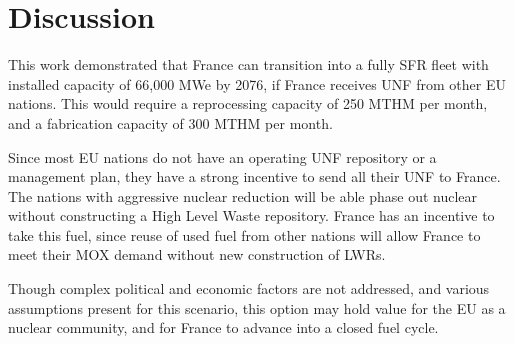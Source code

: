 \section{Discussion}
This work demonstrated that France can transition into
a fully \gls{SFR} fleet with installed capacity of 66,000 MWe by 2076,
if France receives \gls{UNF} from other \gls{EU} nations.
This would require a reprocessing capacity of 250 MTHM per month,
and a fabrication capacity of 300 MTHM per month.

Since most \gls{EU} nations do not have an operating \gls{UNF}
repository or a management plan, they have a strong incentive
to send all their \gls{UNF} to France. The nations
with aggressive nuclear reduction will be able phase out nuclear
without constructing a High Level Waste repository. France has an
incentive to take this fuel, since reuse of used fuel from
other nations will allow France to meet their MOX demand
without new construction of \glspl{LWR}.

Though complex political and economic factors are not
addressed, and various assumptions present for this scenario,
this option may hold value for the \gls{EU} as a nuclear community,
and for France to advance into a closed fuel cycle.
